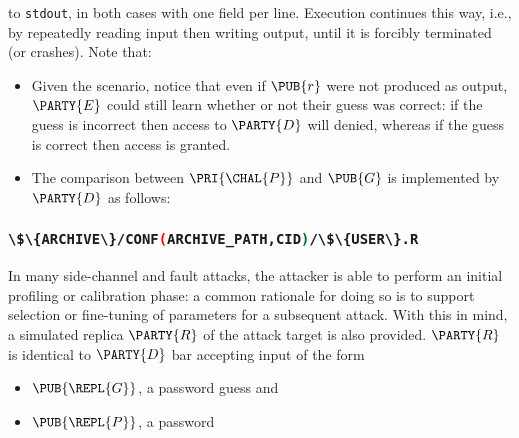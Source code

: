 \documentclass[crop={false},multi={true},tikz={true}]{standalone}
\begin{document}
\noindent
to \lstinline[language={bash}]{stdout}, in both cases with one field per 
line.  Execution continues this way, i.e., by repeatedly reading input 
then writing output, until it is forcibly terminated (or crashes).  
Note that:

\begin{itemize}
\item Given the scenario, notice that even if $\PUB{r}$ were not produced 
      as output, $\PARTY{E}$ could still learn whether or not their guess 
      was correct: if the guess is incorrect then access to $\PARTY{D}$ 
      will denied, whereas if the guess is correct then access is granted.
\item The comparison between $\PRI{\CHAL{P}}$ and $\PUB{G}$ is implemented 
      by $\PARTY{D}$ as follows:

      \begin{algorithm}[H]
       {
        \;
      }
       {
         {
          \; 
        }
      }
      \; 
      \end{algorithm}
\end{itemize}

\subsubsection{\lstinline[language={bash}]|\$\{ARCHIVE\}/CONF(ARCHIVE_PATH,CID)/\$\{USER\}.R|}

In many side-channel and fault attacks, the attacker is able to perform an 
initial profiling or calibration phase: a common rationale for doing so is 
to support selection or fine-tuning of parameters for a subsequent attack.  
With this in mind, a simulated replica $\PARTY{R}$ of the attack target is 
also provided.
$\PARTY{R}$ is identical to $\PARTY{D}$ bar accepting input of the form

\begin{itemize}
\item $\PUB{\REPL{G}}$,
      a  password guess
      and
\item $\PUB{\REPL{P}}$,
      a  password
\end{itemize}
\end{document}
